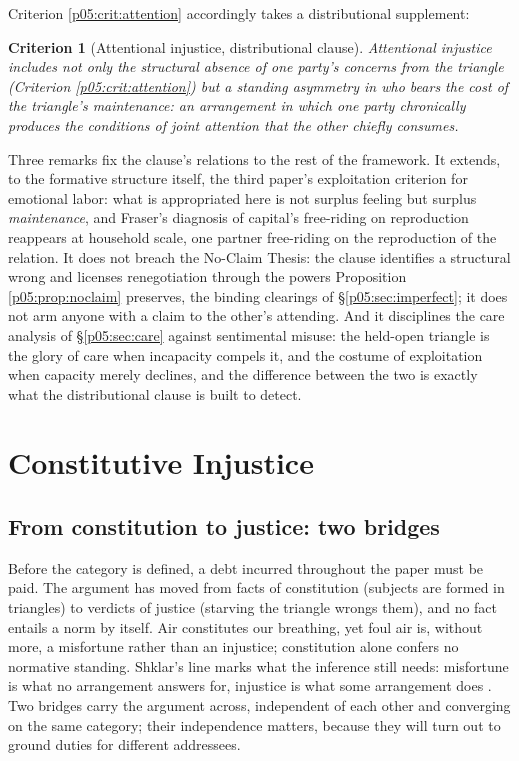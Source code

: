 \documentclass[11pt,a4paper]{article}
\theoremstyle{seriesthm}
\newtheorem{crit}{Criterion}
\begin{document}
Criterion \ref{p05:crit:attention} accordingly takes a distributional supplement:

\begin{crit}[Attentional injustice, distributional clause]\label{p05:crit:distribution}
Attentional injustice includes not only the structural absence of one party's concerns from the triangle (Criterion \ref{p05:crit:attention}) but a standing asymmetry in who bears the cost of the triangle's maintenance: an arrangement in which one party chronically produces the conditions of joint attention that the other chiefly consumes.
\end{crit}

Three remarks fix the clause's relations to the rest of the framework. It extends, to the formative structure itself, the third paper's exploitation criterion for emotional labor: what is appropriated here is not surplus feeling but surplus \emph{maintenance}, and Fraser's diagnosis of capital's free-riding on reproduction \parencite{fraser2016} reappears at household scale, one partner free-riding on the reproduction of the relation. It does not breach the No-Claim Thesis: the clause identifies a structural wrong and licenses renegotiation through the powers Proposition \ref{p05:prop:noclaim} preserves, the binding clearings of §\ref{p05:sec:imperfect}; it does not arm anyone with a claim to the other's attending. And it disciplines the care analysis of §\ref{p05:sec:care} against sentimental misuse: the held-open triangle is the glory of care when incapacity compels it, and the costume of exploitation when capacity merely declines, and the difference between the two is exactly what the distributional clause is built to detect.

\section{Constitutive Injustice}
\label{p05:sec:constitutive}

\subsection{From constitution to justice: two bridges}
\label{p05:sec:bridge}

Before the category is defined, a debt incurred throughout the paper must be paid. The argument has moved from facts of constitution (subjects are formed in triangles) to verdicts of justice (starving the triangle wrongs them), and no fact entails a norm by itself. Air constitutes our breathing, yet foul air is, without more, a misfortune rather than an injustice; constitution alone confers no normative standing. Shklar's line marks what the inference still needs: misfortune is what no arrangement answers for, injustice is what some arrangement does \parencite{shklar1990}. Two bridges carry the argument across, independent of each other and converging on the same category; their independence matters, because they will turn out to ground duties for different addressees.
\end{document}
